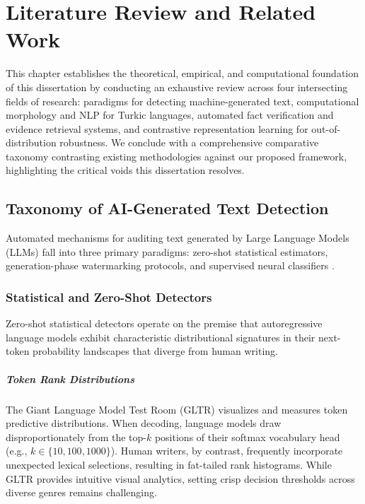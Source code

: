 \chapter{Literature Review and Related Work}
\label{chap:related_work}

This chapter establishes the theoretical, empirical, and computational foundation of this dissertation by conducting an exhaustive review across four intersecting fields of research: paradigms for detecting machine-generated text, computational morphology and NLP for Turkic languages, automated fact verification and evidence retrieval systems, and contrastive representation learning for out-of-distribution robustness. We conclude with a comprehensive comparative taxonomy contrasting existing methodologies against our proposed framework, highlighting the critical voids this dissertation resolves.

\section{Taxonomy of AI-Generated Text Detection}
\label{sec:rel_mgt_detection}

Automated mechanisms for auditing text generated by Large Language Models (LLMs) fall into three primary paradigms: zero-shot statistical estimators, generation-phase watermarking protocols, and supervised neural classifiers \citep{solaiman2019release,mitchell2023detectgpt,wang2024raid}.

\subsection{Statistical and Zero-Shot Detectors}
Zero-shot statistical detectors operate on the premise that autoregressive language models exhibit characteristic distributional signatures in their next-token probability landscapes that diverge from human writing. 

\paragraph{Token Rank Distributions}
The Giant Language Model Test Room (GLTR) \citep{gehrmann2019gltr} visualizes and measures token predictive distributions. When decoding, language models draw disproportionately from the top-$k$ positions of their softmax vocabulary head (e.g., $k \in \{10, 100, 1000\}$). Human writers, by contrast, frequently incorporate unexpected lexical selections, resulting in fat-tailed rank histograms. While GLTR provides intuitive visual analytics, setting crisp decision thresholds across diverse genres remains challenging.

